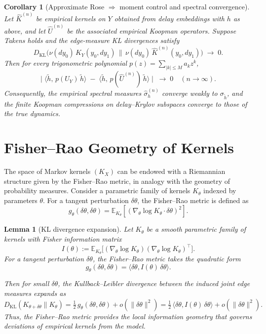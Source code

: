 \documentclass[11pt]{article}
\newtheorem{corollary}{Corollary}
\newtheorem{lemma}{Lemma}
\begin{document}
\begin{corollary}[Approximate Rose $\Rightarrow$ moment control and spectral convergence]
Let $\widehat K^{(n)}$ be empirical kernels on $Y$ obtained from delay embeddings with $h$ as above, and let $\widehat U^{(n)}$ be the associated empirical Koopman operators. Suppose Takens holds and the edge-measure KL divergences satisfy
\[
  D_{\mathrm{KL}}\!\Big(\nu(dy_0)\,K_Y(y_0,dy_1)\,\Big\|\, \nu(dy_0)\,\widehat K^{(n)}(y_0,dy_1)\Big)\;\longrightarrow\;0.
\]
Then for every trigonometric polynomial $p(z)=\sum_{|k|\le M} a_k z^k$,
\[
  \Big|\;\langle \tilde h,\, p(U_Y)\,\tilde h\rangle \;-\; \langle \tilde h,\, p(\widehat U^{(n)})\,\tilde h\rangle\;\Big|
  \;\;\to\;0 \quad (n\to\infty).
\]
Consequently, the empirical spectral measures $\widehat\sigma_h^{(n)}$ converge weakly to $\sigma_{\tilde h}$, and the finite Koopman compressions on delay–Krylov subspaces converge to those of the true dynamics.
\end{corollary}


\section{Fisher--Rao Geometry of Kernels}\label{sec:fisher}
The space of Markov kernels $(K_X)$ can be endowed with a Riemannian structure given by the Fisher--Rao metric, in analogy with the geometry of probability measures. Consider a parametric family of kernels $K_\theta$ indexed by parameters $\theta$. For a tangent perturbation $\delta\theta$, the Fisher--Rao metric is defined as
\[
  g_\theta(\delta\theta, \delta\theta) = \mathbb{E}_{K_\theta}\!\left[\left( \nabla_{\!\theta} \log K_\theta \cdot \delta\theta \right)^2\right].
\]

\begin{lemma}[KL divergence expansion]
Let $K_\theta$ be a smooth parametric family of kernels with Fisher information matrix
\[
  I(\theta) := \mathbb{E}_{K_\theta}\!\big[ (\nabla_{\!\theta}\log K_\theta)(\nabla_{\!\theta}\log K_\theta)^\top \big].
\]
For a tangent perturbation $\delta\theta$, the Fisher--Rao metric takes the quadratic form
\[
  g_\theta(\delta\theta,\delta\theta) = \langle \delta\theta, I(\theta)\,\delta\theta \rangle.
\]

Then for small $\delta\theta$, the Kullback--Leibler divergence between the induced joint edge measures expands as
\[
  D_{\mathrm{KL}}(K_{\theta+\delta\theta} \| K_\theta) 
   = \tfrac{1}{2}\, g_\theta(\delta\theta, \delta\theta) + o(\|\delta\theta\|^2)
   = \tfrac{1}{2}\,\langle \delta\theta, I(\theta)\,\delta\theta \rangle + o(\|\delta\theta\|^2).
\]
Thus, the Fisher--Rao metric provides the local information geometry that governs deviations of empirical kernels from the model.
\end{lemma}
\end{document}
